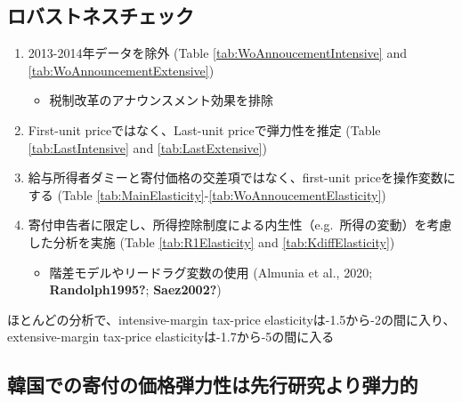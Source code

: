 \documentclass[
  11pt,
  a4paper,
]{article}
\providecommand{\tightlist}{%
  \setlength{\itemsep}{0pt}\setlength{\parskip}{0pt}}
\begin{document}
\hypertarget{ux30edux30d0ux30b9ux30c8ux30cdux30b9ux30c1ux30a7ux30c3ux30af}{%
\subsection{ロバストネスチェック}\label{ux30edux30d0ux30b9ux30c8ux30cdux30b9ux30c1ux30a7ux30c3ux30af}}

\begin{enumerate}
\def\labelenumi{\arabic{enumi}.}
\tightlist
\item
  2013-2014年データを除外 (Table \ref{tab:WoAnnoucementIntensive} and \ref{tab:WoAnnouncementExtensive})

  \begin{itemize}
  \tightlist
  \item
    税制改革のアナウンスメント効果を排除
  \end{itemize}
\item
  First-unit priceではなく、Last-unit priceで弾力性を推定 (Table \ref{tab:LastIntensive} and \ref{tab:LastExtensive})
\item
  給与所得者ダミーと寄付価格の交差項ではなく、first-unit priceを操作変数にする (Table \ref{tab:MainElasticity}-\ref{tab:WoAnnoucementElasticity})
\item
  寄付申告者に限定し、所得控除制度による内生性（e.g.~所得の変動）を考慮した分析を実施 (Table \ref{tab:R1Elasticity} and \ref{tab:KdiffElasticity})

  \begin{itemize}
  \tightlist
  \item
    階差モデルやリードラグ変数の使用 (Almunia et al., 2020; \textbf{Randolph1995?}; \textbf{Saez2002?})
  \end{itemize}
\end{enumerate}

ほとんどの分析で、intensive-margin tax-price elasticityは-1.5から-2の間に入り、
extensive-margin tax-price elasticityは-1.7から-5の間に入る

\hypertarget{ux97d3ux56fdux3067ux306eux5bc4ux4ed8ux306eux4fa1ux683cux5f3eux529bux6027ux306fux5148ux884cux7814ux7a76ux3088ux308aux5f3eux529bux7684}{%
\subsection{韓国での寄付の価格弾力性は先行研究より弾力的}\label{ux97d3ux56fdux3067ux306eux5bc4ux4ed8ux306eux4fa1ux683cux5f3eux529bux6027ux306fux5148ux884cux7814ux7a76ux3088ux308aux5f3eux529bux7684}}
\end{document}
